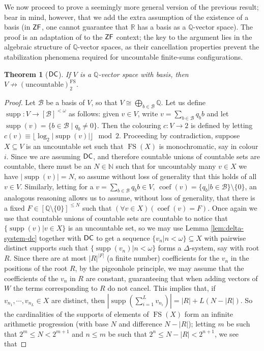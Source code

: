 \documentclass{amsart}
\newtheorem{theorem}{Theorem}[section]
\theoremstyle{definition}
\newcommand{\zf}{\mathnormal{\mathsf{ZF}}}
\newcommand{\dc}{\mathnormal{\mathsf{DC}}}
\theoremstyle{remark}
\numberwithin{equation}{section}
\begin{document}
We now proceed to prove a seemingly more general version of the previous result; bear in mind, however, that we add the extra assumption of the existence of a basis (in $\zf$, one cannot guarantee that $\mathbb R$ has a basis as a $\mathbb Q$-vector space). The proof is an adaptation of \cite[Theorem 5]{Fernandez2018} to the $\zf$ context; the key to the argument lies in the algebraic structure of $\mathbb{Q}$-vector spaces, as their cancellation properties prevent the stabilization phenomena required for uncountable finite-sums configurations.

\begin{theorem}[$\dc$]\label{thm:hindman-fails-uncountable}
If $V$ is a $\mathbb{Q}$-vector space with basis, then $V\nrightarrow(\mathrm{uncountable})^{\operatorname{FS}}_{2}$.
\end{theorem}
    \begin{proof}
        Let $\mathcal{B}$ be a basis of $V$, so that $V\cong\bigoplus_{b\in\mathcal{B}}\mathbb{Q}$. Let us define $\operatorname{supp}:V\to[\mathcal{B}]^{<\omega}$ as follows: given $v\in V$, write $v=\sum_{b\in\mathcal{B}}q_{b}b$ and let $\operatorname{supp}(v)=\{b\in\mathcal{B}\mid q_{b}\neq0\}$. Then the colouring $c:V\longrightarrow 2$ is defined by letting $c(v)\equiv\lfloor\log_{2}|\operatorname{supp}(v)|\rfloor\mod 2$. Proceeding by contradiction, suppose $X\subseteq V$ is an uncountable set such that $\operatorname{FS}(X)$ is monochromatic, say in colour $i$. Since we are assuming $\dc$, and therefore countable unions of countable sets are countable, there must be an $N\in\mathbb N$ such that for uncountably many $v\in X$ we have $|\operatorname{supp}(v)|=N$, so assume without loss of generality that this holds of all $v\in V$. Similarly, letting for a $v=\sum_{b\in\mathcal{B}}q_{b}b\in V$, $\operatorname{coef}(v)=\{q_{b}\big| b\in\mathcal{B}\}\setminus\{0\}$, an analogous reasoning allows us to assume, without loss of generality, that there is a fixed $F\in[\mathbb{Q}\setminus\{0\}]^{\leq N}$ such that $(\forall v\in X)(\operatorname{coef}(v)=F)$. Once again we use that countable unions of countable sets are countable to notice that $\{\operatorname{supp}(v)\big|v\in X\}$ is an uncountable set, so we may use Lemma \ref{lem:delta-system-dc} together with $\dc$ to get a sequence $\{v_{n}|n<\omega\}\subseteq X$ with pairwise distinct supports such that $\{\operatorname{supp}(v_n)\big|n<\omega\}$ forms a $\Delta$-system, say with root $R$. Since there are at most $|R|^{|F|}$ (a finite number) coefficients for the $v_{n}$ in the positions of the root $R$, by the pigeonhole principle, we may assume that the coefficients of the $v_{n}$ in $R$ are constant, guaranteeing that when adding vectors of $W$ the terms corresponding to $R$ do not cancel. This implies that, if $v_{n_{1}},\cdots,v_{n_{L}}\in X$ are distinct, then $\left|\operatorname{supp}\left(\sum_{i=1}^{L}v_{n_{i}}\right)\right|=|R|+L(N-|R|)$. So the cardinalities of the supports of elements of $\operatorname{FS}(X)$ form an infinite arithmetic progression (with base $N$ and difference $N-|R|$); letting $m$ be such that $2^{m}\leq N<2^{m+1}$ and $n\leq m$ be such that $2^{n}\leq N-|R|<2^{n+1}$, we see that 

\end{proof}
\end{document}
